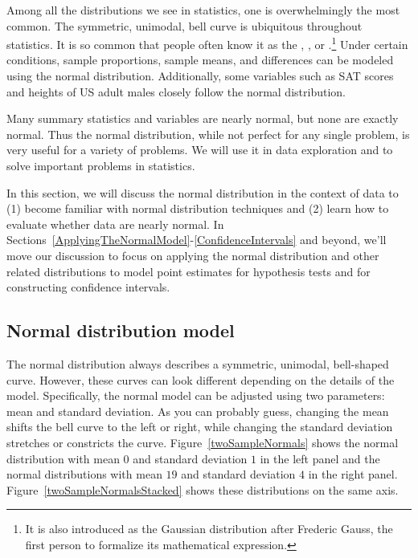 
Among all the distributions we see in statistics, one is overwhelmingly the most common. The symmetric, unimodal, bell curve is ubiquitous throughout statistics. It is so common that people often know it as the , , or .\footnote{It is also introduced as the Gaussian distribution after Frederic Gauss, the first person to formalize its mathematical expression.} Under certain conditions, sample proportions, sample means, and differences can be modeled using the normal distribution. Additionally, some variables such as SAT scores and heights of US adult males closely follow the normal distribution.

\begin{termBox}{
Many summary statistics and variables are nearly normal, but none are exactly normal. Thus the normal distribution, while not perfect for any single problem, is very useful for a variety of problems. We will use it in data exploration and to solve important problems in statistics.\vspace{0.7mm}}
\end{termBox}

In this section, we will discuss the normal distribution in the context of data to (1) become familiar with normal distribution techniques and (2) learn how to evaluate whether data are nearly normal. In Sections~\ref{ApplyingTheNormalModel}-\ref{ConfidenceIntervals} and beyond, we'll move our discussion to focus on applying the normal distribution and other related distributions to model point estimates for hypothesis tests and for constructing confidence intervals.

\subsection{Normal distribution model}
\label{NormalDistributionModelSubsection}

The normal distribution always describes a symmetric, unimodal, bell-shaped curve. However, these curves can look different depending on the details of the model. Specifically, the normal model can be adjusted using two parameters: mean and standard deviation. As you can probably guess, changing the mean shifts the bell curve to the left or right, while changing the standard deviation stretches or constricts the curve. Figure~\ref{twoSampleNormals} shows the normal distribution with mean $0$ and standard deviation $1$ in the left panel and the normal distributions with mean $19$ and standard deviation $4$ in the right panel. Figure~\ref{twoSampleNormalsStacked} shows these distributions on the same axis.

